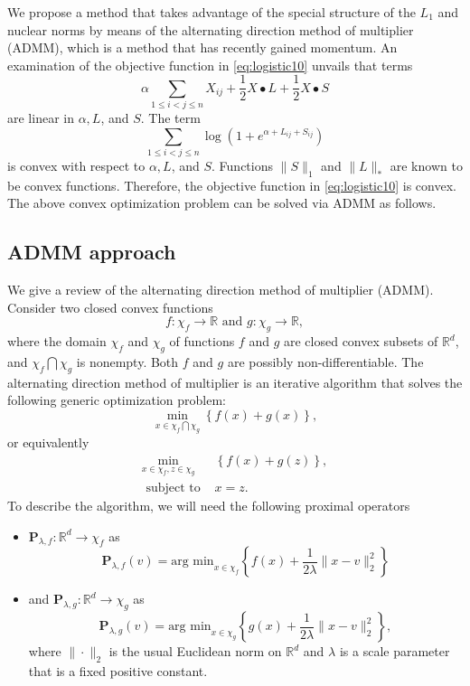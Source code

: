 \documentclass{article}
\begin{document}
We propose a method that takes advantage of the special structure
of the $L_1$ and nuclear norms by means of the
alternating direction method of multiplier (ADMM), which is a method
that has recently gained momentum.
An examination of the objective function in \eqref{eq:logistic10} unvails that
terms
\[
\alpha \sum_{1\le i< j\le n}X_{ij} +\frac{1}{2} X \bullet L +\frac{1}{2} X \bullet S
\]
are linear in $\alpha,  L$, and $S$.
The term
\[
\sum_{1\le i<j\le n} \log \left(1 + e^{\alpha + L_{ij} +S_{ij}}\right)
\]
is convex with respect to $\alpha,  L$, and $S$.
Functions $\|S\|_1$ and $\|L\|_\ast$ are known to be convex functions.
Therefore, the objective function in \eqref{eq:logistic10} is convex. The above convex optimization problem can be solved via ADMM as follows.


\subsection{ADMM approach}
\label{sec:ADMM}
We give a review of the alternating direction method
of multiplier (ADMM).
Consider two closed convex functions
$$
f : \chi_f \to \mathbb{R} \mbox{ and } g : \chi_g \to \mathbb{R},
$$
where the domain $\chi_f$ and $\chi_g$ of functions $f$ and $g$ are closed convex subsets of $\mathbb{R}^d$, and $\chi_f \bigcap \chi_g$ is nonempty.
Both $f$ and $g$ are possibly non-differentiable.
The alternating direction method
of multiplier is an iterative algorithm that solves the following generic optimization problem:
$$
\min_{x \in \chi_f \bigcap \chi_g} \left\{f(x) + g(x) \right\},
$$
or equivalently
\begin{eqnarray}
\label{eq:admm1}
\min_{x \in \chi_f, z\in \chi_g} & \left\{f(x) + g(z) \right\}, \\
\mbox{ subject to } & x = z. \nonumber
\end{eqnarray}
To describe the algorithm, we will need the following proximal operators
\begin{itemize}
\item $\mathbf{P}_{\lambda,f}: \mathbb{R}^d \to \chi_f$ as
$$
\mathbf{P}_{\lambda,f}(v) = \mbox{arg min}_{x \in \chi_f} \left\{
f(x) + \frac{1}{2\lambda} \|x-v\|^2_2
\right\}
$$

\item and $\mathbf{P}_{\lambda,g}: \mathbb{R}^d \to \chi_g$ as
$$
\mathbf{P}_{\lambda,g}(v) = \mbox{arg min}_{x \in \chi_g} \left\{
g(x) + \frac{1}{2\lambda} \|x-v\|^2_2
\right\},
$$
where $\|\cdot\|_2$ is the usual Euclidean norm on $\mathbb{R}^d$ and $\lambda$ is a scale parameter that is a fixed positive constant.
\end{itemize}
\end{document}
